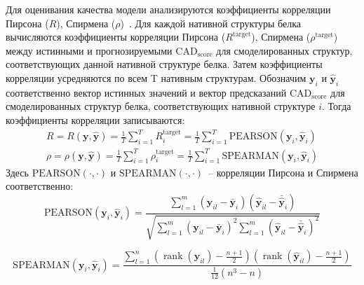 \documentclass[14pt]{extarticle}
\begin{document}
Для оценивания качества модели анализируются коэффициенты корреляции Пирсона ($R$), Спирмена ($\rho$)~\cite{3DCNN, Baldassarre2019GraphQAPM, 10.1093/bioinformatics/btz122}. Для каждой нативной структуры белка вычисляются коэффициенты корреляции Пирсона ($R^\text{target}$), Спирмена ($\rho^\text{target}$) между истинными и прогнозируемыми $\text{CAD}_\text{score}$ для смоделированных структур, соответствующих данной нативной структуре белка. Затем коэффициенты корреляции усредняются по всем T нативным структурам. Обозначим $\mathbf{y}_i$ и $\mathbf{\hat{y}}_i$ соответственно вектор истинных значений и вектор предсказаний $\text{CAD}_\text{score}$ для смоделированных структур белка, соответствующих нативной структуре $i$. Тогда коэффициенты корреляции записываются:
$$\begin{aligned}
R = R\left(\mathbf{y}, \hat{\mathbf{y}}\right) = \frac{1}{T} \sum_{i=1}^{T} R^\text{target}_i=\frac{1}{T} \sum_{i=1}^{T} \text{PEARSON} \left(\mathbf{y}_i,\hat{\mathbf{y}}_i\right) \\ 
\rho= \rho\left(\mathbf{y}, \hat{\mathbf{y}}\right) = \frac{1}{T} \sum_{i=1}^{T} \rho^\text{target}_i = \frac{1}{T} \sum_{i=1}^{T} \text{SPEARMAN} \left(\mathbf{y}_i,\hat{\mathbf{y}}_i\right)
\end{aligned}$$
Здесь $\text{PEARSON} (\cdot, \cdot)$ и $\text{SPEARMAN} (\cdot, \cdot)$~-- корреляции Пирсона и Спирмена соответственно:
\[\text{PEARSON}\left(\mathbf{y}_i,\hat{\mathbf{y}}_i\right) = \frac{\sum_{l=1}^{m}\left(\mathbf{y}_{i l}-\bar{\mathbf{y}}_{i}\right)\left( \hat{\mathbf{y}}_{i l}-\bar{ \hat{\mathbf{y}}}_{i}\right)}{\sqrt{\sum_{l=1}^{m}\left( \mathbf{y}_{i l}-\bar{ \mathbf{y}}_{i}\right)^{2} \sum_{l=1}^{m}\left( \hat{\mathbf{y}}_{i l}-\bar{ \hat{\mathbf{y}}}_{i}\right)^{2}}}\]

\[ \text{SPEARMAN} \left(\mathbf{y}_i,\hat{\mathbf{y}}_i\right)=\frac{\sum_{l=1}^{n}\left(\operatorname{rank}\left(
	\mathbf{y}_{i l}\right)-\frac{n+1}{2}\right)\left(\operatorname{rank}\left( \hat{\mathbf{y}}_{i l}\right)-\frac{n+1}{2}\right)}{\frac{1}{12}\left(n^{3}-n\right)}\]

\end{document}
